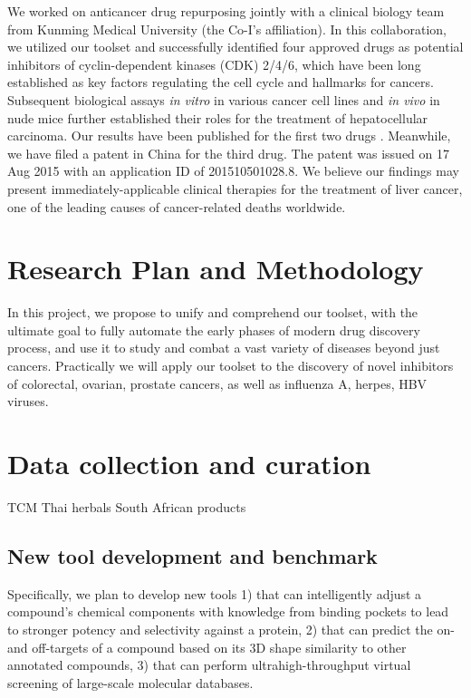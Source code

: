 \documentclass[a4paper,12pt]{article}
\begin{document}
We worked on anticancer drug repurposing jointly with a clinical biology team from Kunming Medical University (the Co-I's affiliation). In this collaboration, we utilized our toolset and successfully identified four approved drugs as potential inhibitors of cyclin-dependent kinases (CDK) 2/4/6, which have been long established as key factors regulating the cell cycle and hallmarks for cancers. Subsequent biological assays \textit{in vitro} in various cancer cell lines and \textit{in vivo} in nude mice further established their roles for the treatment of hepatocellular carcinoma. Our results have been published for the first two drugs \cite{1606}. Meanwhile, we have filed a patent in China for the third drug. The patent was issued on 17 Aug 2015 with an application ID of 201510501028.8. We believe our findings may present immediately-applicable clinical therapies for the treatment of liver cancer, one of the leading causes of cancer-related deaths worldwide.

\section*{Research Plan and Methodology}

In this project, we propose to unify and comprehend our toolset, with the ultimate goal to fully automate the early phases of modern drug discovery process, and use it to study and combat a vast variety of diseases beyond just cancers. Practically we will apply our toolset to the discovery of novel inhibitors of colorectal, ovarian, prostate cancers, as well as influenza A, herpes, HBV viruses.

\section*{Data collection and curation}

TCM
Thai herbals
South African products

\subsection*{New tool development and benchmark}

Specifically, we plan to develop new tools 1) that can intelligently adjust a compound’s chemical components with knowledge from binding pockets to lead to stronger potency and selectivity against a protein, 2) that can predict the on- and off-targets of a compound based on its 3D shape similarity to other annotated compounds, 3) that can perform ultrahigh-throughput virtual screening of large-scale molecular databases.
\end{document}
